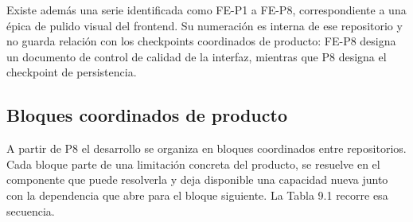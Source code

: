 Existe además una serie identificada como FE-P1 a FE-P8, correspondiente a una épica de pulido visual del frontend. Su numeración es interna de ese repositorio y no guarda relación con los checkpoints coordinados de producto: FE-P8 designa un documento de control de calidad de la interfaz, mientras que P8 designa el checkpoint de persistencia.

\subsection{Bloques coordinados de producto}
\label{anexo:f-bloques-coordinados}

A partir de P8 el desarrollo se organiza en bloques coordinados entre repositorios. Cada bloque parte de una limitación concreta del producto, se resuelve en el componente que puede resolverla y deja disponible una capacidad nueva junto con la dependencia que abre para el bloque siguiente. La Tabla 9.1 recorre esa secuencia.

